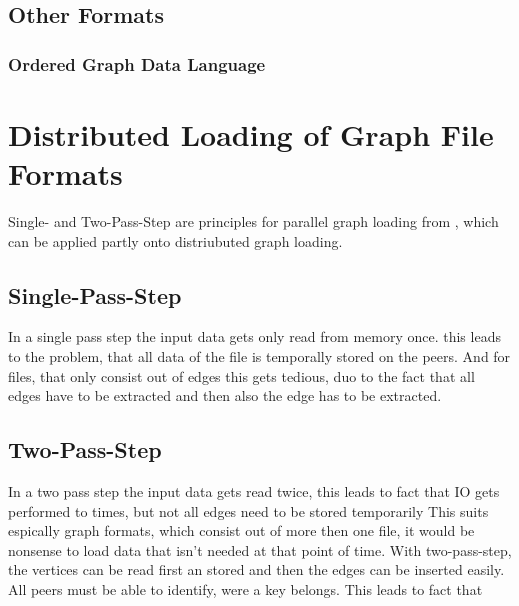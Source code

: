\subsection{Other Formats}
\subsubsection{Ordered Graph Data Language}

\section{Distributed Loading of Graph File Formats}
Single- and Two-Pass-Step are principles for parallel graph loading from \cite{parallelGraphLoading}, which can be applied partly onto distriubuted graph loading.
\subsection{Single-Pass-Step}
In a single pass step the input data gets only read from memory once. this leads to the problem, that all data of the file is temporally stored on the peers. And for files, that only consist out of edges this gets tedious, duo to the fact that all edges have to be extracted and then also the edge has to be extracted.
\subsection{Two-Pass-Step}
In a two pass step the input data gets read twice, this leads to fact that IO gets performed to times, but not all edges need to be stored temporarily This suits espically graph formats, which consist out of more then one file, it would be nonsense to load data that isn't needed at that point of time. With two-pass-step, the vertices can be read first an stored and then the edges can be inserted easily.
\\
All peers must be able to identify, were a key belongs. This leads to fact that


